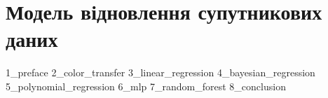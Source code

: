 \chapter{Модель відновлення супутникових даних}
{1_preface}
{2_color_transfer}
{3_linear_regression}
{4_bayesian_regression}
{5_polynomial_regression}
{6_mlp}
{7_random_forest}
{8_conclusion}
